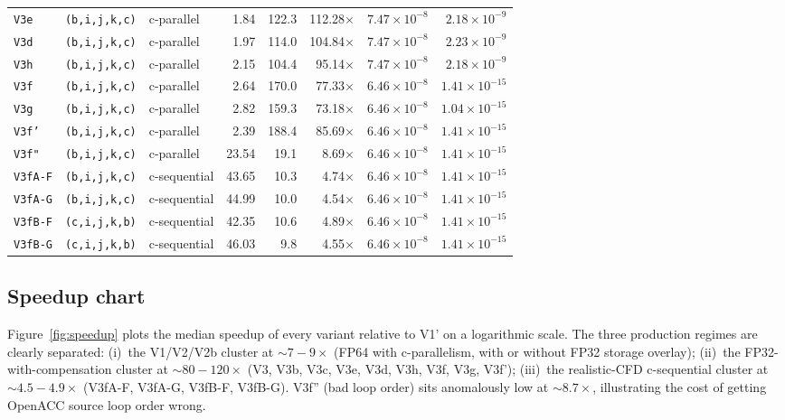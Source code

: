 \documentclass[11pt,a4paper]{article}
\begin{document}
{\begin{longtable}{@{}lp{2.3cm}p{2.2cm}rrrrr@{}}
\texttt{V3e} & \scriptsize\texttt{(b,i,j,k,c)} & c-parallel & 1.84 & 122.3 & 112.28\(\times\) & \(7.47{\times}10^{-8}\) & \(2.18{\times}10^{-9}\) \\
\texttt{V3d} & \scriptsize\texttt{(b,i,j,k,c)} & c-parallel & 1.97 & 114.0 & 104.84\(\times\) & \(7.47{\times}10^{-8}\) & \(2.23{\times}10^{-9}\) \\
\texttt{V3h} & \scriptsize\texttt{(b,i,j,k,c)} & c-parallel & 2.15 & 104.4 & 95.14\(\times\) & \(7.47{\times}10^{-8}\) & \(2.18{\times}10^{-9}\) \\
\texttt{V3f} & \scriptsize\texttt{(b,i,j,k,c)} & c-parallel & 2.64 & 170.0 & 77.33\(\times\) & \(6.46{\times}10^{-8}\) & \(1.41{\times}10^{-15}\) \\
\texttt{V3g} & \scriptsize\texttt{(b,i,j,k,c)} & c-parallel & 2.82 & 159.3 & 73.18\(\times\) & \(6.46{\times}10^{-8}\) & \(1.04{\times}10^{-15}\) \\
\texttt{V3f'} & \scriptsize\texttt{(b,i,j,k,c)} & c-parallel & 2.39 & 188.4 & 85.69\(\times\) & \(6.46{\times}10^{-8}\) & \(1.41{\times}10^{-15}\) \\
\texttt{V3f"} & \scriptsize\texttt{(b,i,j,k,c)} & c-parallel & 23.54 & 19.1 & 8.69\(\times\) & \(6.46{\times}10^{-8}\) & \(1.41{\times}10^{-15}\) \\
\texttt{V3fA-F} & \scriptsize\texttt{(b,i,j,k,c)} & c-sequential & 43.65 & 10.3 & 4.74\(\times\) & \(6.46{\times}10^{-8}\) & \(1.41{\times}10^{-15}\) \\
\texttt{V3fA-G} & \scriptsize\texttt{(b,i,j,k,c)} & c-sequential & 44.99 & 10.0 & 4.54\(\times\) & \(6.46{\times}10^{-8}\) & \(1.41{\times}10^{-15}\) \\
\texttt{V3fB-F} & \scriptsize\texttt{(c,i,j,k,b)} & c-sequential & 42.35 & 10.6 & 4.89\(\times\) & \(6.46{\times}10^{-8}\) & \(1.41{\times}10^{-15}\) \\
\texttt{V3fB-G} & \scriptsize\texttt{(c,i,j,k,b)} & c-sequential & 46.03 & 9.8 & 4.55\(\times\) & \(6.46{\times}10^{-8}\) & \(1.41{\times}10^{-15}\) \\
\bottomrule
\end{longtable}
}

\subsection{Speedup chart}

Figure~\ref{fig:speedup} plots the median speedup of every variant
relative to V1' on a logarithmic scale. The three production regimes
are clearly separated: (i)~the V1/V2/V2b cluster at \(\sim
7\!-\!9\times\) (FP64 with c-parallelism, with or without FP32
storage overlay); (ii)~the FP32-with-compensation cluster at
\(\sim 80\!-\!120\times\) (V3, V3b, V3c, V3e, V3d, V3h, V3f, V3g,
V3f'); (iii)~the realistic-CFD c-sequential cluster at
\(\sim 4.5\!-\!4.9\times\) (V3fA-F, V3fA-G, V3fB-F, V3fB-G).
V3f'' (bad loop order) sits anomalously low at \(\sim 8.7\times\),
illustrating the cost of getting OpenACC source loop order wrong.
\end{document}
